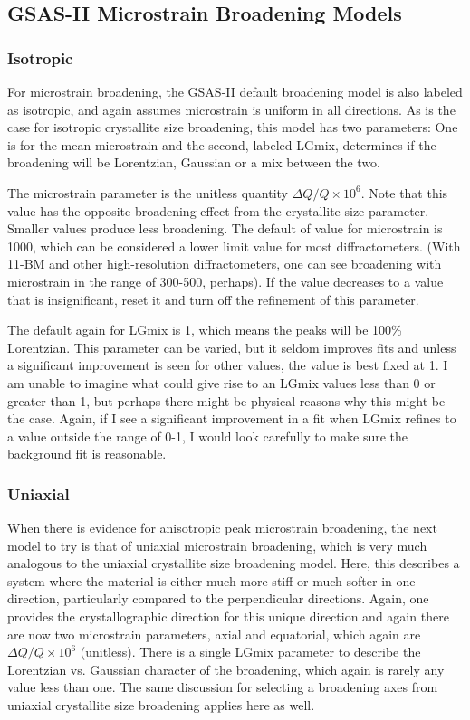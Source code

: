  

\subsection{GSAS-II Microstrain Broadening Models}

\subsubsection{Isotropic}
For microstrain broadening, the GSAS-II default broadening model is also labeled as isotropic, and again assumes microstrain is uniform in all directions. As is the case for isotropic crystallite size broadening, this model has two parameters: One is for the mean microstrain and the second, labeled LGmix, determines if the broadening will be Lorentzian, Gaussian or a mix between the two. 

 The microstrain parameter is the unitless quantity $\Delta Q/Q \times 10^6$. Note that this value has the opposite broadening effect from the crystallite size parameter. Smaller values produce less broadening. The default of value for microstrain is 1000, which can be considered a lower limit value for most diffractometers. (With 11-BM and other high-resolution diffractometers, one can see broadening with microstrain in the range of 300-500, perhaps). If the value decreases to a value that is insignificant, reset it and turn off the refinement of this parameter.

 The default again for LGmix is 1, which means the peaks will be 100\% Lorentzian. This parameter can be varied, but it seldom improves fits and unless a significant improvement is seen for other values, the value is best fixed at 1. I am unable to imagine what could give rise to an LGmix values less than 0 or greater than 1, but perhaps there might be physical reasons why this might be the case. Again, if I see a significant improvement in a fit when LGmix refines to a value outside the range of 0-1, I would look carefully to make sure the background fit is reasonable.

 \subsubsection{Uniaxial}
 When there is evidence for anisotropic peak microstrain broadening, the next model to try is that of uniaxial microstrain broadening, which is very much analogous to the uniaxial crystallite size broadening model. Here, this describes a system where the material is either much more stiff or much softer in one direction, particularly compared to the perpendicular directions. Again, one provides the crystallographic direction for this unique direction and again there are now two microstrain parameters, axial and equatorial, which again are $\Delta Q/Q \times 10^6$ (unitless). There is a single LGmix parameter to describe the Lorentzian vs. Gaussian character of the broadening, which again is rarely any value less than one. The same discussion for selecting a broadening axes from uniaxial crystallite size broadening applies here as well. 

